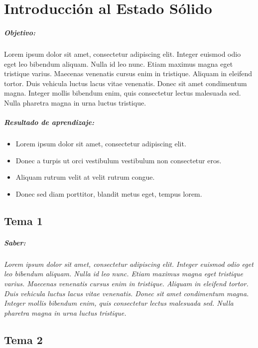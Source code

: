 \chapter{Introducción al Estado Sólido}
\paragraph{Objetivo:}
Lorem ipsum dolor sit amet, consectetur adipiscing elit. Integer euismod odio eget leo bibendum aliquam. Nulla id leo nunc. Etiam maximus magna eget tristique varius. Maecenas venenatis cursus enim in tristique. Aliquam in eleifend tortor. Duis vehicula luctus lacus vitae venenatis. Donec sit amet condimentum magna. Integer mollis bibendum enim, quis consectetur lectus malesuada sed. Nulla pharetra magna in urna luctus tristique.

\paragraph{Resultado de aprendizaje: }

\begin{itemize}
	\item Lorem ipsum dolor sit amet, consectetur adipiscing elit.
	\item Donec a turpis ut orci vestibulum vestibulum non consectetur eros.
	\item Aliquam rutrum velit at velit rutrum congue.
	\item Donec sed diam porttitor, blandit metus eget, tempus lorem.
\end{itemize}


\section{Tema 1}
\paragraph{Saber: }
\textit{
	Lorem ipsum dolor sit amet, consectetur adipiscing elit. Integer euismod odio eget leo bibendum aliquam. Nulla id leo nunc. Etiam maximus magna eget tristique varius. Maecenas venenatis cursus enim in tristique. Aliquam in eleifend tortor. Duis vehicula luctus lacus vitae venenatis. Donec sit amet condimentum magna. Integer mollis bibendum enim, quis consectetur lectus malesuada sed. Nulla pharetra magna in urna luctus tristique.
}

\section{Tema 2}
